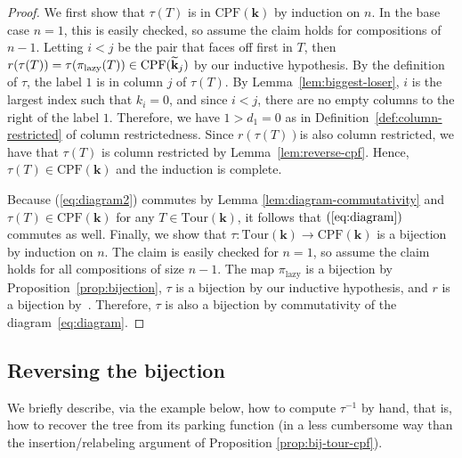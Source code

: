 \documentclass[11pt]{amsart}
\newcommand{\CPF}{\mathrm{CPF}}
\newcommand{\Tour}{\mathrm{Tour}}
\newcommand{\forget}{\pi_{\mathrm{lazy}}}
\numberwithin{thm}{section}
\numberwithin{equation}{section}
\numberwithin{figure}{section}
\theoremstyle{definition}
\begin{document}
\begin{proof}
We first show that $\tau(T)$ is in $\CPF(\mathbf{k})$ by induction on $n$. In the base case $n=1$, this is easily checked, so assume the claim holds for compositions of $n-1$. Letting $i<j$ be the pair that faces off first in $T$, then $r(\tau(T)) = \tau(\forget(T))\in \CPF(\widetilde{\bf k}_j)$ by our inductive hypothesis. By the definition of $\tau$, the label $1$ is in column $j$ of $\tau(T)$. By Lemma~\ref{lem:biggest-loser}, $i$ is the largest index such that $k_i=0$, and since $i<j$, there are no empty columns to the right of the label $1$. Therefore, we have $1>d_1=0$ as in Definition~\ref{def:column-restricted} of column restrictedness. Since $r(\tau(T))$is also column restricted, we have that $\tau(T)$ is column restricted by Lemma~\ref{lem:reverse-cpf}. Hence, $\tau(T)\in \CPF(\mathbf{k})$ and the induction is complete.
  
  Because (\ref{eq:diagram2}) commutes by Lemma \ref{lem:diagram-commutativity} and $\tau(T)\in \CPF(\mathbf{k})$ for any $T\in \Tour(\mathbf{k})$, it follows that $(\ref{eq:diagram})$ commutes as well.  Finally, we show that $\tau : \Tour(\mathbf{k})\to \CPF(\mathbf{k})$ is a bijection by induction on $n$. The claim is easily checked for $n=1$, so assume the claim holds for all compositions of size $n-1$. The map $\forget$ is a bijection by Proposition~\ref{prop:bijection}, $\tau$ is a bijection by our inductive hypothesis, and $r$ is a bijection by~\cite{CGM}. Therefore, $\tau$ is also a bijection by commutativity of the diagram~\eqref{eq:diagram}.
\end{proof}

\subsection{Reversing the bijection}

We briefly describe, via the example below, how to compute $\tau^{-1}$ by hand, that is, how to recover the tree from its parking function (in a less cumbersome way than the insertion/relabeling argument of Proposition \ref{prop:bij-tour-cpf}).
\end{document}
